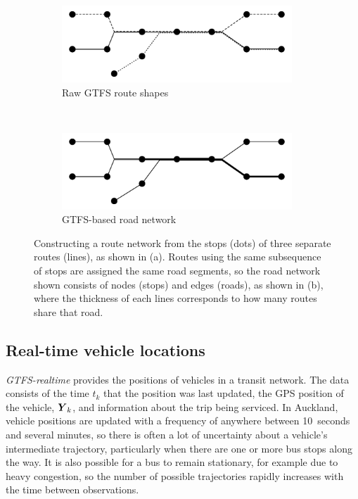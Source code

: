 \begin{figure}[tb]
    \centering
    \begin{subfigure}{0.7\textwidth}
        \centering
        \includegraphics[width=0.95\textwidth]{figures/02_network_segments_1.pdf}
        \caption{Raw GTFS route shapes}
        \label{fig:network_creation_1}
    \end{subfigure} \\
    \begin{subfigure}{0.7\textwidth}
        \centering
        \includegraphics[width=0.95\textwidth]{figures/02_network_segments_2.pdf}
        \caption{GTFS-based road network}
        \label{fig:network_creation_2}
    \end{subfigure}
    \caption{
        Constructing a route network from the stops (dots) of three separate
        routes (lines), as shown in (a).
        Routes using the same subsequence of stops are assigned the same
        road segments, so the road network shown 
        consists of nodes (stops) and edges (roads),
        as shown in (b), where the thickness of each lines
        corresponds to how many routes share that road.
    }
    \label{fig:network_creation}
\end{figure}


\subsection{Real-time vehicle locations}
\label{sec:realtime_data}

\emph{GTFS-realtime} provides the positions of vehicles in a transit network.
The data consists of the time $t_k$ that the position was last updated,
the GPS position of the vehicle, $\mbox{$\boldsymbol{Y}$}_k$, 
and information about the trip being serviced.
In Auckland, vehicle positions are updated with a frequency of anywhere between 10~seconds and several minutes,
so there is often a lot of uncertainty about a vehicle's intermediate trajectory,
particularly when there are one or more bus stops along the way.
It is also possible for a bus to remain stationary,
for example due to heavy congestion,
so the number of possible trajectories rapidly increases with 
the time between observations.


